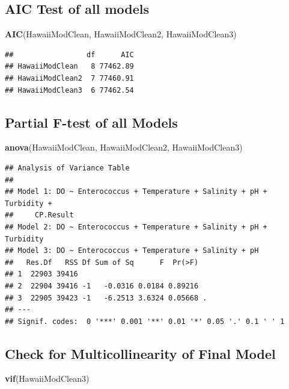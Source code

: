\documentclass[12pt,]{article}
\newenvironment{Shaded}{\begin{snugshade}}{\end{snugshade}}
\newcommand{\KeywordTok}[1]{\textcolor[rgb]{0.13,0.29,0.53}{\textbf{#1}}}
\newcommand{\NormalTok}[1]{#1}
\begin{document}
\subsection{AIC Test of all models}\label{aic-test-of-all-models}

\begin{Shaded}
\begin{Highlighting}[]
\KeywordTok{AIC}\NormalTok{(HawaiiModClean, HawaiiModClean2, HawaiiModClean3)}
\end{Highlighting}
\end{Shaded}

\begin{verbatim}
##                 df      AIC
## HawaiiModClean   8 77462.89
## HawaiiModClean2  7 77460.91
## HawaiiModClean3  6 77462.54
\end{verbatim}

\subsection{Partial F-test of all
Models}\label{partial-f-test-of-all-models}

\begin{Shaded}
\begin{Highlighting}[]
\KeywordTok{anova}\NormalTok{(HawaiiModClean, HawaiiModClean2, HawaiiModClean3)}
\end{Highlighting}
\end{Shaded}

\begin{verbatim}
## Analysis of Variance Table
## 
## Model 1: DO ~ Enterococcus + Temperature + Salinity + pH + Turbidity + 
##     CP.Result
## Model 2: DO ~ Enterococcus + Temperature + Salinity + pH + Turbidity
## Model 3: DO ~ Enterococcus + Temperature + Salinity + pH
##   Res.Df   RSS Df Sum of Sq      F  Pr(>F)  
## 1  22903 39416                              
## 2  22904 39416 -1   -0.0316 0.0184 0.89216  
## 3  22905 39423 -1   -6.2513 3.6324 0.05668 .
## ---
## Signif. codes:  0 '***' 0.001 '**' 0.01 '*' 0.05 '.' 0.1 ' ' 1
\end{verbatim}

\subsection{Check for Multicollinearity of Final
Model}\label{check-for-multicollinearity-of-final-model}

\begin{Shaded}
\begin{Highlighting}[]
\KeywordTok{vif}\NormalTok{(HawaiiModClean3)}
\end{Highlighting}
\end{Shaded}
\end{document}
